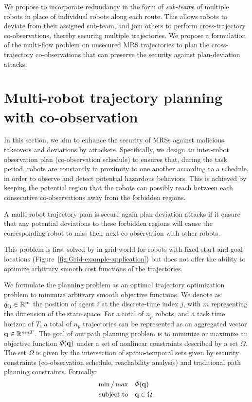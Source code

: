 \documentclass[journal]{IEEEtran}  %
\begin{document}
We propose to incorporate redundancy in the form of \emph{sub-team}s of multiple robots in place of individual robots along each route. This allows robots to deviate from their assigned sub-team, and join others to perform cross-trajectory co-observations, thereby securing multiple trajectories. We propose a formulation of the multi-flow problem on unsecured MRS trajectories to plan the cross-trajectory co-observations that can preserve the security against plan-deviation attacks.


\section{Multi-robot trajectory planning with co-observation}\label{sec:ADMM-planning}

In this section, we aim to enhance the security of MRSs against malicious takeovers and deviations by attackers. Specifically, we design an inter-robot observation plan (co-observation schedule) to ensures that, during the task period, robots are constantly in proximity to one another according to a schedule, in order to observe and detect potential hazardous behaviors. 
This is achieved by keeping the potential region that the robots can possibly reach between each consecutive co-observations away from the forbidden regions. 
\begin{definition}\label{def:secured-plan}
  A multi-robot trajectory plan is secure again plan-deviation attacks if it ensure that any potential deviations to these forbidden regions will cause the corresponding robot to miss their next co-observation with other robots. 
\end{definition}

This problem is first solved by \cite{wardega2019resilience} in grid world for robots with fixed start and goal locations (Figure~\ref{fig:Grid-example-application}) but does not offer the ability to optimize arbitrary smooth cost functions of the trajectories. 

We formulate the planning problem as an optimal trajectory optimization problem to minimize arbitrary smooth objective functions. 
We denote as $q_{ij}\in\mathbb{R}^{m}{}$ the position of agent $i$ at the discrete-time index $j$, with $m$ representing the dimension of the state space. For a total of $n_p$ robots, and a task time horizon of $T$, a total of $n_p$ trajectories can be represented as an aggregated vector $\mathbf{q}\in \mathbb{R}^{n m T}{}$. 
The goal of our path planning problem is to minimize or maximize an objective function $\varPhi(\mathbf{q})$ under a set of nonlinear constraints described by a set $\Omega$. The set $\Omega$ is given by the intersection of spatio-temporal sets given by  security constraints (co-observation schedule, reachability analysis) and traditional path planning constraints. Formally:
\begin{equation}\label{eq:general-problem}
	\begin{split}
		\min/\max & \quad \varPhi(\mathbf{q})\\
		\textrm{subject to} &\quad \mathbf{q} \in \Omega.
	\end{split}
\end{equation}
\end{document}
